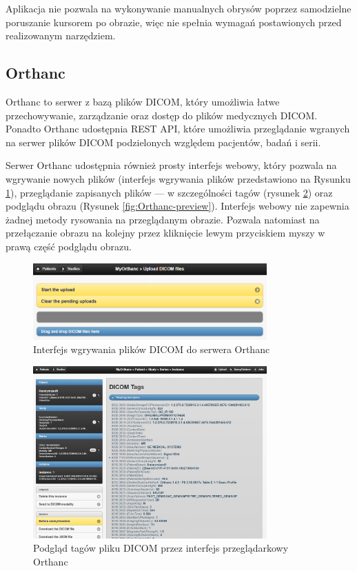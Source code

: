 \documentclass[a4paper,11pt,twoside,openright]{report}
\theoremstyle{definition}
\begin{document}
Aplikacja nie pozwala na wykonywanie manualnych obrysów poprzez samodzielne poruszanie kursorem po obrazie, więc nie spełnia wymagań postawionych przed realizowanym narzędziem.

\subsection {Orthanc}

Orthanc to serwer z bazą plików DICOM, który umożliwia łatwe przechowywanie, zarządzanie oraz dostęp do plików medycznych DICOM. Ponadto Orthanc udostępnia REST API, które umożliwia przeglądanie wgranych na serwer plików DICOM podzielonych względem pacjentów, badań i serii.

Serwer Orthanc udostępnia również prosty interfejs webowy, który pozwala na wgrywanie nowych plików (interfejs wgrywania plików przedstawiono na Rysunku \ref{fig:Orthanc-upload}), przeglądanie zapisanych plików --- w szczególności tagów (rysunek \ref{fig:Orthanc-tags}) oraz podglądu obrazu (Rysunek \ref{fig:Orthanc-preview}). Interfejs webowy nie zapewnia żadnej metody rysowania na przeglądanym obrazie. Pozwala natomiast na przełączanie obrazu na kolejny przez kliknięcie lewym przyciskiem myszy w prawą część podglądu obrazu.

\begin{figure}[h]
	\center
	\includegraphics[width=0.8\textwidth]{Orthanc-upload}
	\caption{Interfejs wgrywania plików DICOM do serwera Orthanc}
    	\label{fig:Orthanc-upload}
\end{figure}

\begin{figure}[h]
	\center
	\includegraphics[width=0.8\textwidth]{Orthanc-tags}
	\caption{Podgląd tagów pliku DICOM przez interfejs przeglądarkowy Orthanc}
    	\label{fig:Orthanc-tags}
\end{figure}
\end{document}
